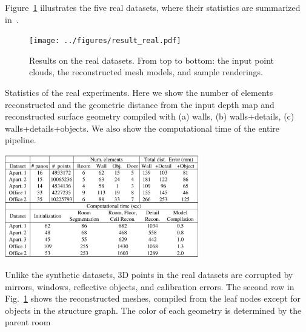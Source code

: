 Figure~\ref{fig:result_real} illustrates the five real datasets, where
their statistics are summarized in~.
\begin{figure}[!t]
\begin{center}
\texttt{[image: ../figures/result\_real.pdf]}
\end{center}
 \vspace{-0.3cm}
\caption{Results on the real datasets.  From top to bottom: the input
 point clouds, the reconstructed mesh models, and sample renderings.}
 \label{fig:result_real}
 \vspace{-0.25cm}
\end{figure}
\begin{table}[!t]
\caption{Statistics of the real experiments. Here we show the number of
 elements reconstructed and the geometric distance from the input depth
 map and reconstructed surface geometry compiled with (a) walls, (b)
 walls+details, (c) walls+details+objects. We also show the
 computational time of the entire pipeline.}
 \vspace{-0.5cm}
\begin{center}
\includegraphics[width=85mm]{../figures/statistics.pdf}
\end{center}
\label{table:statistics}
 \vspace{-0.7cm}
\end{table}
Unlike the synthetic datasets, 3D points in the real datasets are corrupted by
mirrors, windows, reflective objects, and calibration errors.
%
%
The second row in Fig.~\ref{fig:result_real} shows the reconstructed
meshes, compiled from the leaf nodes except for objects in the structure
graph. The color of each geometry is determined by the parent room
